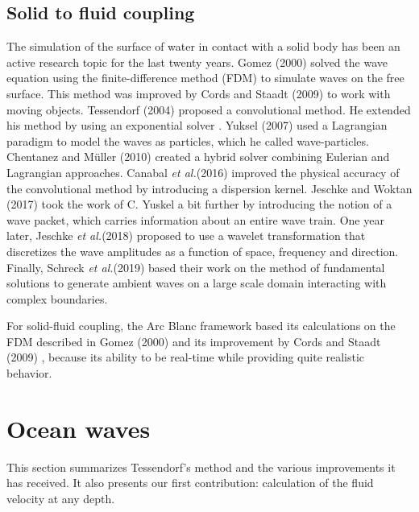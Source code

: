 \documentclass[final]{jcgt}
\def\framework{the Arc Blanc framework\xspace}
\def\etal{\emph{et al.}\xspace}
\begin{document}
\subsection{Solid to fluid coupling}
\label{subsubsec:solidToFluidCoupling}
The simulation of the surface of water in contact with a solid body has been an active research topic for the last twenty years.
Gomez (2000) \cite{gomezInteractiveSimulationWater2000} solved the wave equation using the finite-difference method (FDM) to simulate waves on the free surface.
This method was improved by Cords and Staadt (2009) \cite{cordsRealTimeOpenWater2009} to work with moving objects.
Tessendorf (2004) \cite{tessendorfInteractiveWaterSurface2004} proposed a convolutional method.
He extended his method by using an exponential solver \cite{tessendorfEWaveUsingExponential2014}.
Yuksel (2007) \cite{yuksel2007} used a Lagrangian paradigm to model the waves as particles, which he called wave-particles.
Chentanez and Müller (2010) \cite{chentanezRealTimeSimulationLarge2010} created a hybrid solver combining Eulerian and Lagrangian approaches.
Canabal  \etal (2016) \cite{canabalDispersionKernelsWater2016} improved the physical accuracy of the convolutional method by introducing a dispersion kernel.
Jeschke and Woktan (2017) \cite{jeschkeWaterWavePackets2017} took the work of C. Yuskel a bit further by introducing the notion of a wave packet, which carries information about an entire wave train.
One year later, Jeschke  \etal (2018) \cite{jeschkeWaterSurfaceWavelets2018} proposed to use a wavelet transformation that discretizes the wave amplitudes as a function of space, frequency and direction.
Finally, Schreck  \etal (2019) \cite{schreckFundamentalSolutionsWater2019} based their work on the method of fundamental solutions to generate ambient waves on a large scale domain interacting with complex boundaries.

For solid-fluid coupling, \framework based its calculations on the FDM described in Gomez (2000) \cite{gomezInteractiveSimulationWater2000} and its improvement by Cords and Staadt (2009) \cite{cordsRealTimeOpenWater2009}, because its ability to be real-time while providing quite realistic behavior.

\section{Ocean waves}
\label{sec:oceanWaves}
This section summarizes Tessendorf's method and the various improvements it has received.
It also presents our first contribution: calculation of the fluid velocity at any depth.
\end{document}
